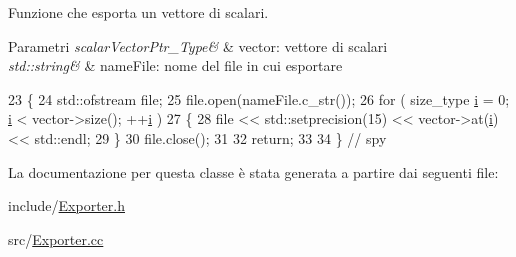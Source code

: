 Funzione che esporta un vettore di scalari. 


\begin{DoxyParams}{Parametri}
{\em scalar\-Vector\-Ptr\-\_\-\-Type\&} & vector\-: vettore di scalari \\
\hline
{\em std\-::string\&} & name\-File\-: nome del file in cui esportare \\
\hline
\end{DoxyParams}

\begin{DoxyCode}
23 \{
24     std::ofstream file;
25     file.open(nameFile.c\_str());
26     \textcolor{keywordflow}{for} ( size\_type \hyperlink{matrici_8m_a6f6ccfcf58b31cb6412107d9d5281426}{i} = 0; \hyperlink{matrici_8m_a6f6ccfcf58b31cb6412107d9d5281426}{i} < vector->size(); ++\hyperlink{matrici_8m_a6f6ccfcf58b31cb6412107d9d5281426}{i} )
27     \{
28         file << std::setprecision(15) << vector->at(\hyperlink{matrici_8m_a6f6ccfcf58b31cb6412107d9d5281426}{i}) << std::endl;
29     \}
30     file.close();
31     
32     \textcolor{keywordflow}{return};
33     
34 \} \textcolor{comment}{// spy}
\end{DoxyCode}


La documentazione per questa classe è stata generata a partire dai seguenti file\-:\begin{DoxyCompactItemize}
\item 
include/\hyperlink{Exporter_8h}{Exporter.\-h}\item 
src/\hyperlink{Exporter_8cc}{Exporter.\-cc}\end{DoxyCompactItemize}
